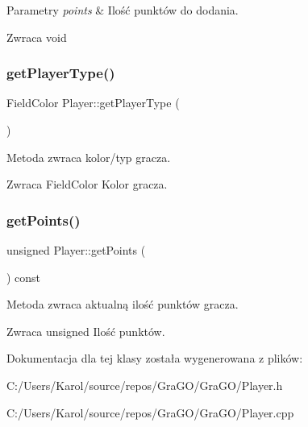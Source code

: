 \begin{DoxyParams}{Parametry}
{\em points} & Ilość punktów do dodania. \\
\hline
\end{DoxyParams}
\begin{DoxyReturn}{Zwraca}
void 
\end{DoxyReturn}
\mbox{\label{class_player_a549d5cae02e7eebf69e918b677780040}} 
\subsubsection{getPlayerType()}
{\footnotesize\ttfamily Field\+Color Player\+::get\+Player\+Type (\begin{DoxyParamCaption}{ }\end{DoxyParamCaption})}



Metoda zwraca kolor/typ gracza. 

\begin{DoxyReturn}{Zwraca}
Field\+Color Kolor gracza. 
\end{DoxyReturn}
\mbox{\label{class_player_a9f398860b72217f120520b336d69e8cf}} 
\subsubsection{getPoints()}
{\footnotesize\ttfamily unsigned Player\+::get\+Points (\begin{DoxyParamCaption}{ }\end{DoxyParamCaption}) const}



Metoda zwraca aktualną ilość punktów gracza. 

\begin{DoxyReturn}{Zwraca}
unsigned Ilość punktów. 
\end{DoxyReturn}


Dokumentacja dla tej klasy została wygenerowana z plików\+:\begin{DoxyCompactItemize}
\item 
C\+:/\+Users/\+Karol/source/repos/\+Gra\+G\+O/\+Gra\+G\+O/Player.\+h\item 
C\+:/\+Users/\+Karol/source/repos/\+Gra\+G\+O/\+Gra\+G\+O/Player.\+cpp\end{DoxyCompactItemize}
